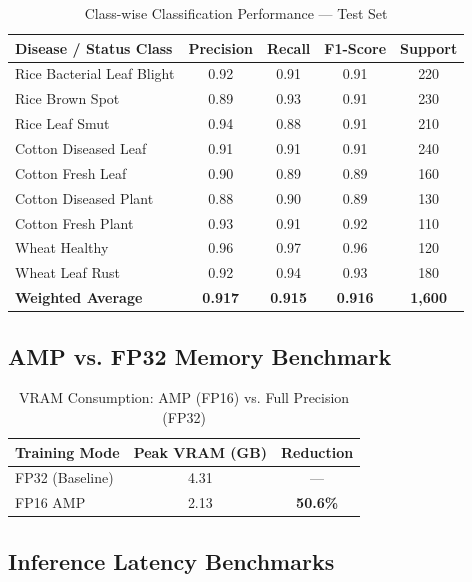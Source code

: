 \documentclass[12pt,oneside]{report}
\begin{document}
\begin{table}[H]
\centering
\caption{Class-wise Classification Performance — Test Set}
\begin{tabular}{@{}lcccc@{}}
\toprule
\textbf{Disease / Status Class} & \textbf{Precision} & \textbf{Recall} & \textbf{F1-Score} & \textbf{Support} \\ \midrule
Rice Bacterial Leaf Blight   & 0.92 & 0.91 & 0.91 & 220 \\
Rice Brown Spot              & 0.89 & 0.93 & 0.91 & 230 \\
Rice Leaf Smut               & 0.94 & 0.88 & 0.91 & 210 \\
Cotton Diseased Leaf         & 0.91 & 0.91 & 0.91 & 240 \\
Cotton Fresh Leaf            & 0.90 & 0.89 & 0.89 & 160 \\
Cotton Diseased Plant        & 0.88 & 0.90 & 0.89 & 130 \\
Cotton Fresh Plant           & 0.93 & 0.91 & 0.92 & 110 \\
Wheat Healthy                & 0.96 & 0.97 & 0.96 & 120 \\
Wheat Leaf Rust              & 0.92 & 0.94 & 0.93 & 180 \\ \midrule
\textbf{Weighted Average}    & \textbf{0.917} & \textbf{0.915} & \textbf{0.916} & \textbf{1,600} \\ \bottomrule
\end{tabular}
\end{table}

\subsection{AMP vs. FP32 Memory Benchmark}

\begin{table}[H]
\centering
\caption{VRAM Consumption: AMP (FP16) vs. Full Precision (FP32)}
\begin{tabular}{@{}lcc@{}}
\toprule
\textbf{Training Mode} & \textbf{Peak VRAM (GB)} & \textbf{Reduction} \\ \midrule
FP32 (Baseline)  & 4.31 & --- \\
FP16 AMP         & 2.13 & \textbf{50.6\%} \\ \bottomrule
\end{tabular}
\end{table}

\subsection{Inference Latency Benchmarks}
\end{document}
